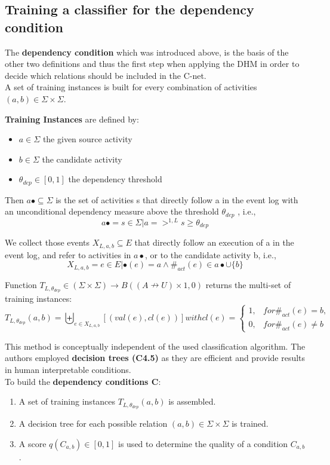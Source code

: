 \subsection{Training a classifier for the dependency condition}
The \textbf{dependency condition} which was introduced above, is the basis of the other two definitions and thus the first step when applying the DHM in order to decide which relations should be included in the C-net.\\
A set of training instances is built for every combination of activities $(a, b) \in \Sigma \times \Sigma$.

\noindent \textbf{Training Instances} are defined by:
\begin{itemize}
\item $ a \in \Sigma$ the given source activity
\item $ b \in \Sigma$ the candidate activity
\item $ \theta_{dep} \in [0,1]$ the dependency threshold
\end{itemize}

\noindent Then $ a\bullet \subseteq \Sigma$ is the set of activities s that directly follow a in the event log with an unconditional dependency measure above the threshold $ \theta_{dep} $ , i.e., 
\[a\bullet = {s \in \Sigma | a => ^{1,L} s \geq \theta_{dep}}\]

\noindent We collect those events $X_{L,a,b} \subseteq E$ that directly follow an execution of a in the event log, and refer to activities in $a\bullet$, or to the candidate activity b, i.e.,  \[X_{L,a,b} = {e \in E | \bullet(e) = a \wedge \#_{act} (e) \in a\bullet \cup \{b\}}\]

\noindent Function $T_{L,\theta_{dep}}\in (\Sigma \times \Sigma) \rightarrow B((A \nrightarrow U) \times {1, 0})$ returns the multi-set of training instances:
\[T_{L,\theta_{dep}} (a, b) = \biguplus _{e \in X_{L,a,b}} [(val(e), cl(e))] with cl(e) =
\begin{cases}
1, & for \#_{act}(e)=b,\\
0, & for \#_{act}(e)\neq b
\end{cases}
\]

\noindent This method is conceptually independent of the used classification algorithm. The authors employed \textbf{decision trees (C4.5)} as they are efficient and provide results in human interpretable conditions.\\
To build the \textbf{dependency conditions C}:
\begin{enumerate}
\item A set of training instances $T_{L,\theta_{dep}} (a, b)$ is assembled.
\item A decision tree for each possible relation $(a, b) \in \Sigma \times \Sigma$ is trained.
\item A score $q(C_{a,b}) \in [0, 1]$ is used to determine the quality of a condition $C_{a,b}$.
\end{enumerate}

